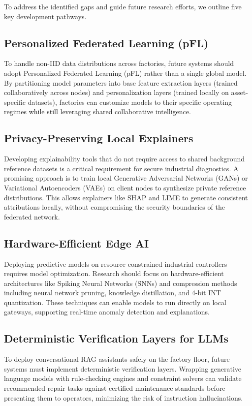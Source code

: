 \documentclass[journal,10pt,compsoc]{IEEEtran}
\begin{document}
To address the identified gaps and guide future research efforts, we outline five key development pathways.

\subsection{Personalized Federated Learning (pFL)}
To handle non-IID data distributions across factories, future systems should adopt Personalized Federated Learning (pFL) rather than a single global model. By partitioning model parameters into base feature extraction layers (trained collaboratively across nodes) and personalization layers (trained locally on asset-specific datasets), factories can customize models to their specific operating regimes while still leveraging shared collaborative intelligence.

\subsection{Privacy-Preserving Local Explainers}
Developing explainability tools that do not require access to shared background reference datasets is a critical requirement for secure industrial diagnostics. A promising approach is to train local Generative Adversarial Networks (GANs) or Variational Autoencoders (VAEs) on client nodes to synthesize private reference distributions. This allows explainers like SHAP and LIME to generate consistent attributions locally, without compromising the security boundaries of the federated network.

\subsection{Hardware-Efficient Edge AI}
Deploying predictive models on resource-constrained industrial controllers requires model optimization. Research should focus on hardware-efficient architectures like Spiking Neural Networks (SNNs) and compression methods including neural network pruning, knowledge distillation, and 4-bit INT quantization. These techniques can enable models to run directly on local gateways, supporting real-time anomaly detection and explanations.

\subsection{Deterministic Verification Layers for LLMs}
To deploy conversational RAG assistants safely on the factory floor, future systems must implement deterministic verification layers. Wrapping generative language models with rule-checking engines and constraint solvers can validate recommended repair tasks against certified maintenance standards before presenting them to operators, minimizing the risk of instruction hallucinations.
\end{document}
